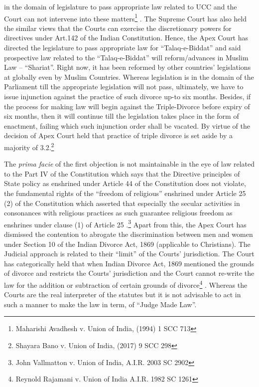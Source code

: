 \begin{multicols}{2}
in the domain of legislature to pass appropriate law related to UCC and the Court can not
intervene into these matters\footnote{Maharishi Avadhesh v. Union of India, (1994) 1 SCC 713}
. The Supreme Court has also held the similar views that the
Courts can exercise the discretionary powers for directives under Art.142 of the Indian
Constitution. Hence, the Apex Court has directed the legislature to pass appropriate law for
“Talaq-e-Biddat” and said prospective law related to the “Talaq-e-Biddat” will
reform/advances in Muslim Law – “Shariat”. Right now, it has been reformed by other
countries’ legislations at globally even by Muslim Countries. Whereas legislation is in the
domain of the Parliament till the appropriate legislation will not pass, ultimately, we have to
issue injunction against the practice of such divorce up-to six months. Besides, if the process
for making law will begin against the Triple-Divorce before expiry of six months, then it will
continue till the legislation takes place in the form of enactment, failing which such
injunction order shall be vacated. By virtue of the decision of Apex Court held that practice
of triple divorce is set aside by a majority of 3.2.\footnote{Shayara Bano v. Union of India, (2017) 9 SCC 298}

\vspace{-.1cm}

\noi 
The {\it prima facie} of the first objection is not maintainable in the eye of law related to the Part
IV of the Constitution which says that the Directive principles of State policy as enshrined
under Article 44 of the Constitution does not violate, the fundamental rights of the “freedom
of religious” enshrined under Article 25 (2) of the Constitution which asserted that especially
the secular activities in consonances with religious practices as such guarantee religious
freedom as enshrines under clause (1) of Article 25
.\footnote{John Vallmatton v. Union of India, A.I.R. 2003 SC 2902} Apart from this, the Apex Court has
dismissed the contention to abrogate the discrimination between men and women under Section 10 of the Indian Divorce Act, 1869 (applicable to Christians). The Judicial approach
is related to their “limit” of the Courts’ jurisdiction. The Court has categorically held that
when Indian Divorce Act, 1869 mentioned the grounds of divorce and restricts the Courts’
jurisdiction and the Court cannot re-write the law for the addition or subtraction of certain
grounds of divorce\footnote{Reynold Rajamani v. Union of India A.I.R. 1982 SC 1261}
. Whereas the Courts are the real interpreter of the statutes but it is not
advisable to act in such a manner to make the law in term, of “Judge Made Law”.


\end{multicols}
